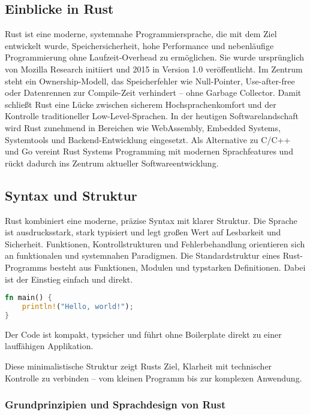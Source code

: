 \subsection{Einblicke in Rust}
Rust ist eine moderne, systemnahe Programmiersprache, die mit dem Ziel entwickelt wurde, Speichersicherheit, hohe Performance und nebenläufige Programmierung ohne Laufzeit-Overhead zu ermöglichen. Sie wurde ursprünglich von Mozilla Research initiiert und 2015 in Version 1.0 veröffentlicht. Im Zentrum steht ein Ownership-Modell, das Speicherfehler wie Null-Pointer, Use-after-free oder Datenrennen zur Compile-Zeit verhindert – ohne Garbage Collector. Damit schließt Rust eine Lücke zwischen sicherem Hochsprachenkomfort und der Kontrolle traditioneller Low-Level-Sprachen. In der heutigen Softwarelandschaft wird Rust zunehmend in Bereichen wie WebAssembly, Embedded Systems, Systemtools und Backend-Entwicklung eingesetzt. Als Alternative zu C/C++ und Go vereint Rust Systems Programming mit modernen Sprachfeatures und rückt dadurch ins Zentrum aktueller Softwareentwicklung.

\subsection{Syntax und Struktur}
Rust kombiniert eine moderne, präzise Syntax mit klarer Struktur. Die Sprache ist ausdrucksstark, stark typisiert und legt großen Wert auf Lesbarkeit und Sicherheit. Funktionen, Kontrollstrukturen und Fehlerbehandlung orientieren sich an funktionalen und systemnahen Paradigmen. Die Standardstruktur eines Rust-Programms besteht aus Funktionen, Modulen und typstarken Definitionen. Dabei ist der Einstieg einfach und direkt.

\begin{lstlisting}[language=Rust]
fn main() {
    println!("Hello, world!");
}
\end{lstlisting}
Der Code ist kompakt, typsicher und führt ohne Boilerplate direkt zu einer lauffähigen Applikation.

Diese minimalistische Struktur zeigt Rusts Ziel, Klarheit mit technischer Kontrolle zu verbinden – vom kleinen Programm bis zur komplexen Anwendung.
\subsubsection{Grundprinzipien und Sprachdesign von Rust}

